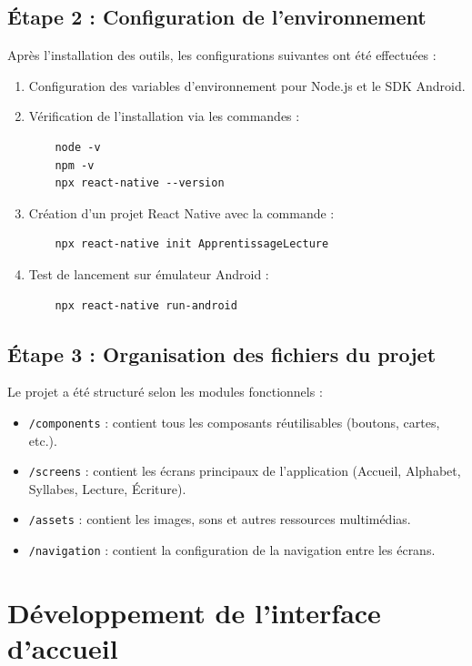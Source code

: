 \documentclass[a4paper,oneside,12pt]{book}
\begin{document}
\subsection{Étape 2 : Configuration de l'environnement}

Après l'installation des outils, les configurations suivantes ont été effectuées :

\begin{enumerate}
	\item Configuration des variables d'environnement pour Node.js et le SDK Android.
	\item Vérification de l'installation via les commandes :
	\begin{verbatim}
	node -v
	npm -v
	npx react-native --version
	\end{verbatim}
	\item Création d'un projet React Native avec la commande :
	\begin{verbatim}
	npx react-native init ApprentissageLecture
	\end{verbatim}
	\item Test de lancement sur émulateur Android :
	\begin{verbatim}
	npx react-native run-android
	\end{verbatim}
\end{enumerate}

\subsection{Étape 3 : Organisation des fichiers du projet}

Le projet a été structuré selon les modules fonctionnels :

\begin{itemize}
	\item \texttt{/components} : contient tous les composants réutilisables (boutons, cartes, etc.).
	\item \texttt{/screens} : contient les écrans principaux de l'application (Accueil, Alphabet, Syllabes, Lecture, Écriture).
	\item \texttt{/assets} : contient les images, sons et autres ressources multimédias.
	\item \texttt{/navigation} : contient la configuration de la navigation entre les écrans.
\end{itemize}



\section{Développement de l'interface d'accueil}
\end{document}
